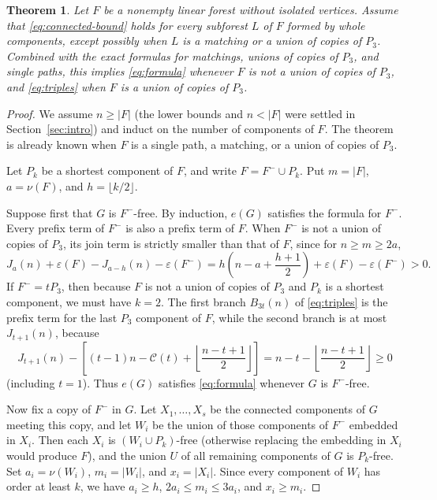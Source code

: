 \documentclass[10pt]{article}
\theoremstyle{compactplain}
\newtheorem{theorem}{Theorem}[section]
\theoremstyle{remark}\newtheorem{remark}[theorem]{Remark}
\begin{document}
\begin{theorem}\label{thm:disconnected-reduction}
Let $F$ be a nonempty linear forest without isolated vertices. Assume
that \eqref{eq:connected-bound} holds for every subforest $L$ of $F$
formed by whole components, except possibly when $L$ is a matching or a
union of copies of $P_3$. Combined with the exact formulas for
matchings, unions of copies of $P_3$, and single paths, this implies
\eqref{eq:formula} whenever $F$ is not a union of copies of $P_3$, and
\eqref{eq:triples} when $F$ is a union of copies of $P_3$.
\end{theorem}
\begin{proof}
We assume $n\ge|F|$ (the lower bounds and $n<|F|$ were settled in
Section~\ref{sec:intro}) and induct on the number of components of $F$.
The theorem is already known when $F$ is a single path, a matching, or a
union of copies of $P_3$.

Let $P_k$ be a shortest component of $F$, and write $F=F^-\cup P_k$. Put
$m=|F|$, $a=\nu(F)$, and $h=\lfloor k/2\rfloor$.

Suppose first that $G$ is $F^-$-free. By induction, $e(G)$ satisfies the
formula for $F^-$. Every prefix term of $F^-$ is also a prefix term of
$F$. When $F^-$ is not a union of copies of $P_3$, its join term is
strictly smaller than that of $F$, since for $n\ge m\ge2a$,
\[
 J_a(n)+\varepsilon(F)-J_{a-h}(n)-\varepsilon(F^-)
 =h\left(n-a+\frac{h+1}{2}\right)+\varepsilon(F)-\varepsilon(F^-)>0.
\]
If $F^-=tP_3$, then because $F$ is not a union of copies of $P_3$ and
$P_k$ is a shortest component, we must have $k=2$. The first branch
$B_{3t}(n)$ of \eqref{eq:triples} is the prefix term for the last $P_3$
component of $F$, while the second branch is at most $J_{t+1}(n)$,
because
\[
 J_{t+1}(n)-\left[(t-1)n-\mathcal{C}(t)
 +\left\lfloor\frac{n-t+1}{2}\right\rfloor\right]
 =n-t-\left\lfloor\frac{n-t+1}{2}\right\rfloor\ge0
\]
(including $t=1$). Thus $e(G)$ satisfies \eqref{eq:formula} whenever $G$
is $F^-$-free.

Now fix a copy of $F^-$ in $G$. Let $X_1,\ldots,X_s$ be the connected
components of $G$ meeting this copy, and let $W_i$ be the union of those
components of $F^-$ embedded in $X_i$. Then each $X_i$ is
$(W_i\cup P_k)$-free (otherwise replacing the embedding in $X_i$ would
produce $F$), and the union $U$ of all remaining components of $G$ is
$P_k$-free. Set $a_i=\nu(W_i)$, $m_i=|W_i|$, and $x_i=|X_i|$. Since
every component of $W_i$ has order at least $k$, we have $a_i\ge h$,
$2a_i\le m_i\le3a_i$, and $x_i\ge m_i$.


\end{proof}
\end{document}
